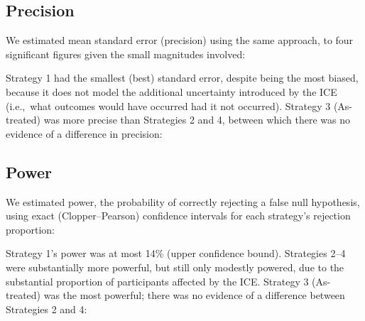 \subsection{Precision}

We estimated mean standard error (precision) using the same approach, to
four significant figures given the small magnitudes involved:

\begin{minipage}{\linewidth}
\begin{stlog}
\nullskip
\end{stlog}
\end{minipage}

Strategy 1 had the smallest (best) standard error, despite being the most
biased, because it does not model the additional uncertainty introduced
by the ICE (i.e.,~what outcomes would have occurred had it not occurred).
Strategy 3 (As-treated) was more precise than Strategies 2 and 4, between
which there was no evidence of a difference in precision:

\begin{minipage}{\linewidth}
\begin{stlog}
\nullskip
\end{stlog}
\end{minipage}

\subsection{Power}

We estimated power, the probability of correctly rejecting a false null
hypothesis, using exact (Clopper--Pearson) confidence intervals for each
strategy's rejection proportion:

\begin{minipage}{\linewidth}
\begin{stlog}
\nullskip
\end{stlog}
\end{minipage}

Strategy 1's power was at most 14\% (upper confidence bound). Strategies
2--4 were substantially more powerful, but still only modestly powered, due to
the substantial proportion of participants affected by the ICE. Strategy 3
(As-treated) was the most powerful; there was no evidence of a difference
between Strategies 2 and 4:

\begin{minipage}{\linewidth}
\begin{stlog}
\nullskip
\end{stlog}
\end{minipage}


